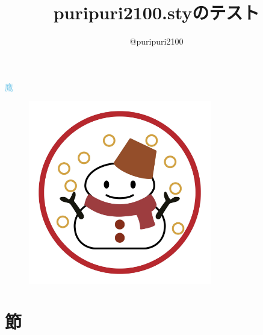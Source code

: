 \documentclass[dvipdfmx]{jsarticle}
\begin{document}
\title{\textsf{puripuri2100.sty}のテスト}
\nonsubtitle

\author{@puripuri2100}
\nondate
\date{\puritoday}
\purimaketitle

\tableofcontents

\textcolor{SkyBlue}{鷹}
\begin{figure}[h]
\centering
\includegraphics[width=80mm]{aki.jpg}
\end{figure}

\section{節}
\end{document}

